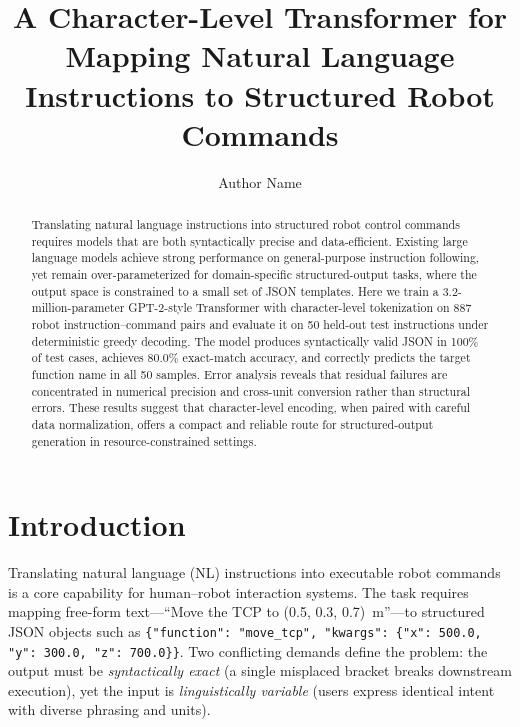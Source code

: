 \documentclass[11pt,a4paper]{article}
\title{A Character-Level Transformer for Mapping Natural Language Instructions to Structured Robot Commands}
\author{Author Name}
\date{}
\begin{document}
\maketitle

\begin{abstract}
Translating natural language instructions into structured robot control commands requires models that are both syntactically precise and data-efficient.
Existing large language models achieve strong performance on general-purpose instruction following, yet remain over-parameterized for domain-specific structured-output tasks,
where the output space is constrained to a small set of JSON templates.
Here we train a 3.2-million-parameter GPT-2-style Transformer with character-level tokenization on 887 robot instruction--command pairs
and evaluate it on 50 held-out test instructions under deterministic greedy decoding.
The model produces syntactically valid JSON in 100\% of test cases, achieves 80.0\% exact-match accuracy,
and correctly predicts the target function name in all 50 samples.
Error analysis reveals that residual failures are concentrated in numerical precision and cross-unit conversion rather than structural errors.
These results suggest that character-level encoding, when paired with careful data normalization,
offers a compact and reliable route for structured-output generation in resource-constrained settings.
\end{abstract}

\section{Introduction}

Translating natural language (NL) instructions into executable robot commands is a core capability for human--robot interaction systems.
The task requires mapping free-form text---``Move the TCP to (0.5, 0.3, 0.7)~m''---to structured JSON objects
such as \texttt{\{"function": "move\_tcp", "kwargs": \{"x": 500.0, "y": 300.0, "z": 700.0\}\}}.
Two conflicting demands define the problem: the output must be \emph{syntactically exact} (a single misplaced bracket breaks downstream execution),
yet the input is \emph{linguistically variable} (users express identical intent with diverse phrasing and units).
\end{document}

